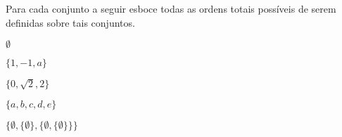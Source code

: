 \begin{questao}\label{test:EquivalenciaOrdem25}
	Para cada conjunto a seguir esboce todas as ordens totais possíveis de serem definidas sobre tais conjuntos.
\end{questao}

\begin{exerList}
	\item $\emptyset$
	\item $\{1, -1, a\}$
	\item $\{0, \sqrt{2}, 2\}$
	\item $\{a, b, c, d, e\}$
	\item $\{\emptyset, \{\emptyset\}, \{\emptyset, \{\emptyset\}\}\}$
\end{exerList}





